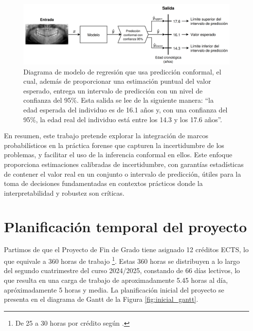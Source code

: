 \begin{figure}[htbp]
    \centering
    \includegraphics[width=\textwidth]{capitulos/cap_01/imagenes/example_intervalic_estimation.png}
    \caption[
        Diagrama de modelo de regresión que usa predicción conformal, el cual, además de proporcionar una estimación puntual del valor esperado, entrega un intervalo de predicción con un nivel de confianza del 95\%.
    ]{ 
        Diagrama de modelo de regresión que usa predicción conformal, el cual, además de proporcionar una estimación puntual del valor esperado, entrega un intervalo de predicción con un nivel de confianza del 95\%.
        Esta salida se lee de la siguiente manera: ``la edad esperada del individuo es de 16.1 años y, con una confianza del 95\%, la edad real del individuo está entre los 14.3 y los 17.6 años''.
    } 
    \label{fig:example_intervalic_estimation}
\end{figure}


En resumen, este trabajo pretende explorar la integración de marcos probabilísticos en la práctica forense que capturen la incertidumbre de los problemas, y facilitar el uso de la inferencia conformal en ellos. Este enfoque proporciona estimaciones calibradas de incertidumbre, con garantías estadísticas de contener el valor real en un conjunto o intervalo de predicción, útiles para la toma de decisiones fundamentadas en contextos prácticos donde la interpretabilidad y robustez son críticas.


\section{Planificación temporal del proyecto}

Partimos de que el Proyecto de Fin de Grado tiene asignado 12 créditos ECTS, lo que equivale a 360 horas de trabajo%
\footnote{
    De 25 a 30 horas por crédito según \cite{ComisionEuropea2015ECTS}.
}. Estas 360 horas se distribuyen a lo largo del segundo cuatrimestre del curso 2024/2025, constando de 66 días lectivos, lo que resulta en una carga de trabajo de aproximadamente 5.45 horas al día, apróximadamente 5 horas y media. La planificación inicial del proyecto se presenta en el diagrama de Gantt de la Figura \ref{fig:inicial_gantt}.


